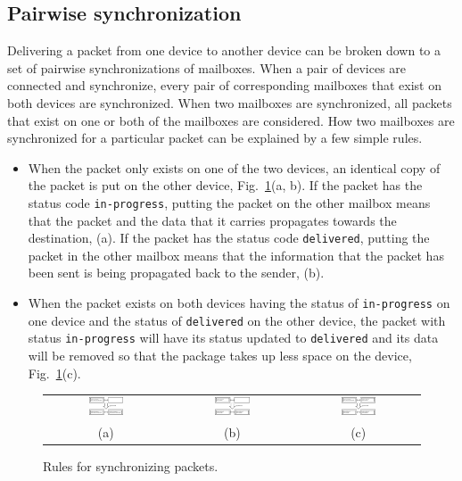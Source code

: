 \documentclass{article}
\begin{document}
\subsection{Pairwise synchronization}
\label{sec:sync}
Delivering a packet from one device to another device can be broken down to a set of pairwise synchronizations of mailboxes. When a pair of devices are connected and synchronize, every pair of corresponding mailboxes that exist on both devices are synchronized. When two mailboxes are synchronized, all packets that exist on one or both of the mailboxes are considered. How two mailboxes are synchronized for a particular packet can be explained by a few simple rules.
\begin{itemize}
  \item When the packet only exists on one of the two devices, an identical copy of the packet is put on the other device, Fig.~\ref{fig:rules}(a, b). If the packet has the status code \texttt{in-progress}, putting the packet on the other mailbox means that the packet and the data that it carries propagates towards the destination, (a). If the packet has the status code \texttt{delivered}, putting the packet in the other mailbox means that the information that the packet has been sent is being propagated back to the sender, (b).
  \item When the packet exists on both devices having the status of \texttt{in-progress} on one device and the status of \texttt{delivered} on the other device, the packet with status \texttt{in-progress} will have its status updated to \texttt{delivered} and its data will be removed so that the package takes up less space on the device, Fig.~\ref{fig:rules}(c).
\end{itemize}

\begin{figure}
  \begin{tabular}{ccc}
    \includegraphics[width=0.3\textwidth]{rulea.eps} & \includegraphics[width=0.3\textwidth]{ruleb.eps} & \includegraphics[width=0.3\textwidth]{rulec.eps} \\
    (a) & (b) & (c)
  \end{tabular}
  \caption{Rules for synchronizing packets.}
  \label{fig:rules}
\end{figure}
\end{document}
